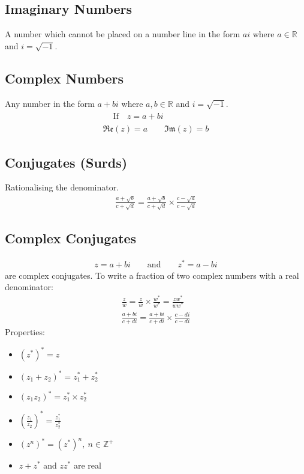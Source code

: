 \documentclass[10pt, a4paper, titlepage]{article}
\begin{document}
\begin{multicols*}{3}
\subsection{Imaginary Numbers}
A number which cannot be placed on a number line in the form $ai$ where $a\in \mathbb{R}$ and $i=\sqrt{-1}$.\\

\dotfill
\subsection{Complex Numbers}
Any number in the form $a+bi$ where $a,b\in \mathbb{R}$ and $i=\sqrt{-1}$.
\begin{gather}
	\begin{flalign}
		&\text{If}\quad z=a+bi&&
	\end{flalign}\\
	\mathfrak{Re} (z)=a\qquad \mathfrak{Im} (z)=b
\end{gather}
\dotfill
\subsection{Conjugates (Surds)}
Rationalising the denominator.
\begin{align}
	\frac{a+\sqrt{b}}{c+\sqrt{d}}=\frac{a+\sqrt{b}}{c+\sqrt{d}}\times \frac{c-\sqrt{d}}{c-\sqrt{d}}
\end{align}
\dotfill
\subsection{Complex Conjugates}
\begin{align}
	z=a+bi\qquad \text{and}\qquad z^*=a-bi
\end{align}
are complex conjugates. To write a fraction of two complex numbers with a real denominator:
\begin{gather}
	\frac{z}{w}=\frac{z}{w}\times \frac{w^*}{w^*}=\frac{zw^*}{ww^*}\\
	\frac{a+bi}{c+di}=\frac{a+bi}{c+di}\times \frac{c-di}{c-di}
\end{gather}
Properties:
\begin{itemize}
	\item $(z^*)^*=z$
	\item $(z_1+z_2)^*=z_1^*+z_2^*$
	\item $(z_1z_2)^*=z_1^*\times z_2^*$
	\item $\left(\frac{z_1}{z_2}\right)^*=\frac{z_1^*}{z_2^*}$
	\item $(z^n)^*=(z^*)^n,\ n\in \mathbb{Z}^+$
	\item $z+z^*$ and $zz^*$ are real
\end{itemize}
\dotfill

\end{multicols*}
\end{document}
